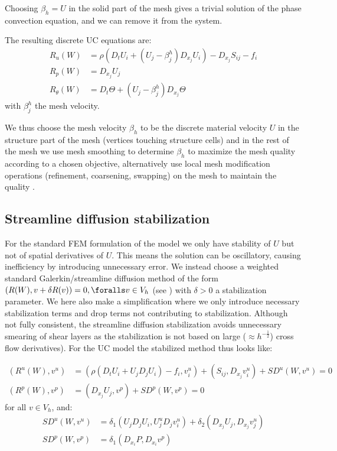Choosing $\beta_h = U$ in the solid part of the mesh gives a trivial
solution of the phase convection equation, and we can remove it from
the system.

The resulting discrete UC
equations are:
\begin{equation}
\begin{split}\label{eq:ALE}
R_u(W) &= \rho(D_t U_i + (U_j - \beta^h_j) D_{x_j} U_i) - D_{x_j} S_{ij} - f_i\\
R_p(W) &= D_{x_j} U_j\\
R_\theta(W) &= D_t \Theta + (U_j - \beta^h_j) D_{x_j} \Theta
\end{split}
\end{equation}
with $\beta^h_j$ the mesh velocity.

We thus choose the mesh velocity $\beta_h$ to be the discrete material
velocity $U$ in the structure part of the mesh (vertices touching
structure cells) and in the rest of the mesh we use mesh smoothing to
determine $\beta_h$ to maximize the mesh quality according to a chosen
objective, alternatively use local mesh modification operations
(refinement, coarsening, swapping) on the mesh to maintain the quality
\citep{Comp`ereRemacleJanssonEtAl2009}.

\subsection{Streamline diffusion stabilization}

For the standard FEM formulation of the model we only have stability
of $U$ but not of spatial derivatives of $U$. This means the solution
can be oscillatory, causing inefficiency by introducing unnecessary
error. We instead choose a weighted standard Galerkin/streamline
diffusion method of the form $(R(W), v + \delta R(v)) = 0, \foralls v
\in V_h$ (see \citet{ErikssonEstepHansboEtAl1996}) with $\delta > 0$ a stabilization
parameter. We here also make a simplification where we only introduce
necessary stabilization terms and drop terms not contributing to
stabilization. Although not fully consistent, the streamline diffusion
stabilization avoids unnecessary smearing of shear layers as the
stabilization is not based on large ($\approx h^{-\frac{1}{2}}$) cross flow
derivatives). For the UC model the stabilized method thus looks like:

\begin{align}
  (R^u(W), v^u) &= (\rho(D_t U_i + U_j D_j U_i) - f_i, v^u_i) + (S_{ij}, D_{x_j} v^u_i) + SD^u(W, v^u) = 0\\
  (R^p(W), v^p) &= (D_{x_j} U_j, v^p) + SD^p(W, v^p) = 0
\end{align}
for all $v \in V_h$, and:
\begin{align}
  SD^u(W, v^u) &= \delta_1 (U_j D_j U_i, U^u_j D_j v^u_i) +
  \delta_2 (D_{x_j} U_j, D_{x_j} v^u_j)\\
  SD^p(W, v^p) &= \delta_1 (D_{x_i} P, D_{x_i} v^p)
\end{align}

